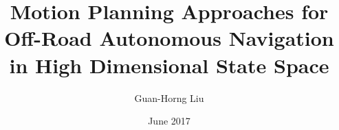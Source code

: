 \documentclass[hidelinks, 12pt]{cmuthesis}
\begin{document}
 
\frontmatter

\pagestyle{empty}

\title{ %
{\bf Motion Planning Approaches for Off-Road Autonomous Navigation in High Dimensional State Space}}
\author{Guan-Horng Liu}
\date{June 2017}


\support{}
\disclaimer{}



\maketitle


\pagestyle{plain}
\end{document}
